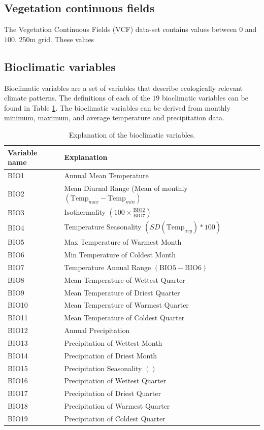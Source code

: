 \subsection{Vegetation continuous fields}
The Vegetation Continuous Fields (VCF) data-set contains values between $0$ and $100$. 
250m grid. These values 
\subsection{Bioclimatic variables}
Bioclimatic variables are a set of variables that describe ecologically relevant climate patterns.  The definitions of each of the $19$ bioclimatic variables can be found in Table \ref{table:Bioclim}. The bioclimatic variables can be derived from monthly minimum, maximum, and average temperature and precipitation data.

\begin{table}[htb]
\begin{tabular}{ll}
\toprule
Variable name & Explanation \\ 
\midrule
BIO1 & Annual Mean Temperature \\
BIO2 & Mean Diurnal Range (Mean of monthly $\left( \text{Temp}_{max} - \text{Temp}_{min} \right)$ \\
BIO3 & Isothermality $\left( 100 \times \frac{\text{BIO2}}{\text{BIO7}} \right)$  \\
BIO4 & Temperature Seasonality $\left(SD(\text{Temp}_{avg}) * 100\right)$ \\
BIO5 & Max Temperature of Warmest Month \\
BIO6 & Min Temperature of Coldest Month \\
BIO7 & Temperature Annual Range $\left(\text{BIO5} - \text{BIO6}\right)$ \\
BIO8 & Mean Temperature of Wettest Quarter \\
BIO9 & Mean Temperature of Driest Quarter \\
BIO10 & Mean Temperature of Warmest Quarter \\
BIO11 & Mean Temperature of Coldest Quarter \\
BIO12 & Annual Precipitation \\
BIO13 & Precipitation of Wettest Month \\
BIO14 & Precipitation of Driest Month \\
BIO15 & Precipitation Seasonality $\left( \right)$ \\
BIO16 & Precipitation of Wettest Quarter \\
BIO17 & Precipitation of Driest Quarter \\
BIO18 & Precipitation of Warmest Quarter \\
BIO19 & Precipitation of Coldest Quarter \\
\bottomrule
\end{tabular}
\caption{\label{table:Bioclim}Explanation of the bioclimatic variables.}
\end{table}

